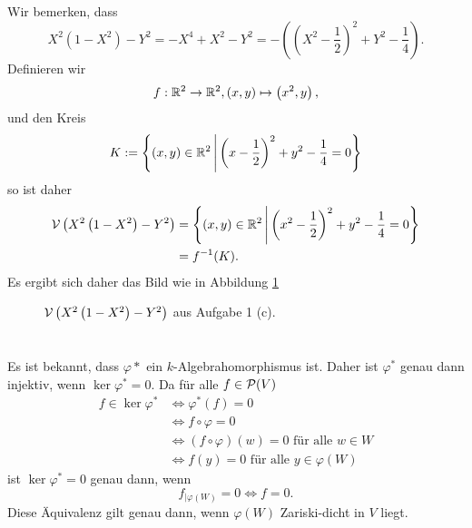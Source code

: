 \documentclass[a4paper,10pt]{article}
\begin{document}
\subsection{}
Wir bemerken, dass
\[
 X^2 \left( 1 - X^2 \right) - Y^2
 = -X^4 + X^2 - Y^2
 = -\left( \left(X^2 - \frac{1}{2} \right)^2 + Y^2 - \frac{1}{4} \right).
\]
Definieren wir
\[
 f : \mathbb{R}^2 \to \mathbb{R}^2, (x,y) \mapsto \left(x^2,y\right),
\]
und den Kreis
\[
 K := \left\{ (x,y) \in \mathbb{R}^2 \,\middle|\, \left(x - \frac{1}{2} \right)^2 + y^2 - \frac{1}{4} = 0 \right\}
\]
so ist daher
\begin{align*}
 \mathcal{V}\left( X^2 \left( 1 - X^2 \right) - Y^2 \right)
 &= \left\{ (x,y) \in \mathbb{R}^2 \,\middle|\, \left(x^2 - \frac{1}{2} \right)^2 + y^2 - \frac{1}{4} = 0 \right\} \\
 &= f^{-1}(K).
\end{align*}
Es ergibt sich daher das Bild wie in Abbildung \ref{fig: lemis carte}
\begin{figure}\centering
 \caption{$\mathcal{V}\left(X^2 \left( 1 - X^2 \right) - Y^2\right)$ aus Aufgabe 1 (c).}
 \label{fig: lemis carte}
\end{figure}





\section{}


\subsection{}
Es ist bekannt, dass $\varphi*$ ein $k$-Algebrahomorphismus ist. Daher ist $\varphi^*$ genau dann injektiv, wenn $\ker \varphi^* = 0$. Da für alle $f \in \mathcal{P}(V)$
\begin{align*}
 f \in \ker \varphi^*
 &\Leftrightarrow \varphi^*(f) = 0 \\
 &\Leftrightarrow f \circ \varphi = 0 \\
 &\Leftrightarrow (f \circ \varphi)(w) = 0 \text{ für alle } w \in W \\
 &\Leftrightarrow f(y) = 0 \text{ für alle } y \in \varphi(W)
\end{align*}
ist $\ker \varphi^* = 0$ genau dann, wenn
\[
 f_{|\varphi(W)} = 0 \Leftrightarrow f = 0.
\]
Diese Äquivalenz gilt genau dann, wenn $\varphi(W)$ Zariski-dicht in $V$ liegt.
\end{document}
